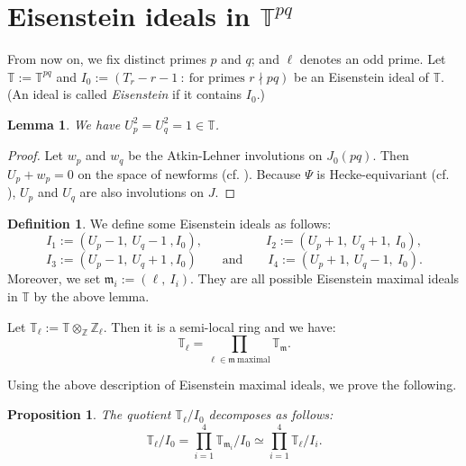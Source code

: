 \documentclass[a4paper, 12pt]{amsart}
\newtheorem{lem}[thm]{Lemma}
\newtheorem{prop}[thm]{Proposition}
\theoremstyle{definition}
\newtheorem{defn}[thm]{Definition}
\theoremstyle{remark}
\numberwithin{equation}{section} \numberwithin{table}{section}
\begin{document}
\section{Eisenstein ideals in ${{\mathbb{T}}}^{pq}$}\label{sec:Eisenstein}
From now on, we fix distinct primes $p$ and $q$; and $\ell$ denotes an odd prime. Let ${{\mathbb{T}}}:={{\mathbb{T}}}^{pq}$ and $I_0:=(T_r-r-1~:~\text{for primes } r \nmid pq)$ be an Eisenstein ideal of ${{\mathbb{T}}}$. (An ideal is called \textit{Eisenstein} if it contains $I_0$.)

\begin{lem}\label{lem:Up^2=1}
We have $U_p^2=U_q^2=1 \in {{\mathbb{T}}}$.
\end{lem}
\begin{proof}
Let $w_p$ and $w_q$ be the Atkin-Lehner involutions on $J_0(pq)$. Then $U_p+w_p=0$ on the space of newforms (cf. \cite[Proposition 3.7]{R90}). Because $\Psi$ is Hecke-equivariant (cf. \cite[]{R90}), $U_p$ and $U_q$ are also involutions on $J$.
\end{proof}

\begin{defn}
We define some Eisenstein ideals as follows: 
$$
I_1 := (U_p-1,~U_q-1~, I_0), \quad\quad\quad\quad\quad I_2 := (U_p+1,~U_q+1,~I_0),
$$
$$
I_3 := (U_p-1,~U_q+1~, I_0) \quad\quad\text{and}\quad\quad I_4 := (U_p+1,~U_q-1,~I_0).
$$
Moreover, we set ${{\mathfrak{m}}}_i :=(\ell, ~I_i)$. They are all possible Eisenstein maximal ideals in ${{\mathbb{T}}}$ by the above lemma.
\end{defn}

Let ${{\mathbb{T}}}_{\ell}:={{\mathbb{T}}} \otimes_{{\mathbb{Z}}} {{\mathbb{Z}}}_{\ell}$. Then it is a semi-local ring and we have:
$$
{{\mathbb{T}}}_{\ell} = \prod_{\ell \in {{\mathfrak{m}}}~ \text{maximal}} {{\mathbb{T}}}_{{\mathfrak{m}}}.
$$

Using the above description of Eisenstein maximal ideals, we prove the following.

\begin{prop}\label{prop:decomposition}
The quotient ${{\mathbb{T}}}_{\ell}/{I_0}$ decomposes as follows:
$$
{{\mathbb{T}}}_{\ell}/{I_0} = \prod_{i=1}^4 {{\mathbb{T}}}_{{{\mathfrak{m}}}_i}/I_0 \simeq \prod_{i=1}^4 {{\mathbb{T}}}_{\ell}/{I_i}.
$$
\end{prop}
\end{document}
